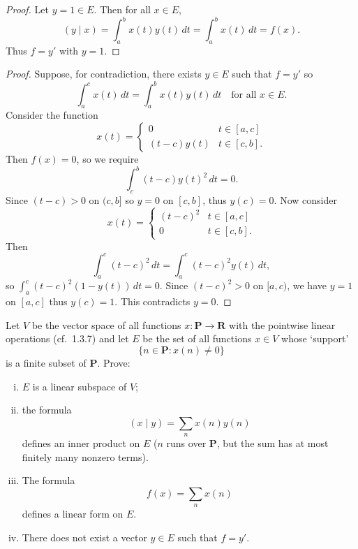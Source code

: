 \begin{proof}
Let $y = 1 \in E$. Then for all $x \in E$,
\[
    (y \mid x) = \int_a^b x(t)y(t)\,dt = \int_a^b x(t)\,dt = f(x).
\]
Thus $f = y'$ with $y = 1$.
\end{proof}


\begin{proof}
Suppose, for contradiction, there exists $y \in E$ such that $f = y'$ so
\[
    \int_a^c x(t)\,dt = \int_a^b x(t)y(t)\,dt \quad \text{for all } x \in E.
\]
Consider the function
\[
    x(t) = \begin{cases} 0 & t \in [a, c] \\ (t-c)y(t) & t \in [c, b]. \end{cases}
\]
Then
$f(x) = 0$, so we require
\[
    \int_c^b (t-c)y(t)^2\,dt = 0.
\]
Since $(t-c) > 0$ on $(c,b]$ so $y = 0$ on $[c,b]$, thus
$y(c) = 0$. Now consider
\[
    x(t) = \begin{cases} (t-c)^2 & t \in [a, c] \\ 0 & t \in [c, b]. \end{cases}
\]
Then
\[
    \int_a^c (t-c)^2\,dt = \int_a^c (t-c)^2 y(t)\,dt,
\]
so $\int_a^c (t-c)^2(1 - y(t))\,dt = 0$. Since $(t-c)^2 > 0$ on $[a,c)$,
we have $y = 1$ on $[a,c]$ thus $y(c) = 1$. This contradicts
$y = 0$.
\end{proof}

\begin{tcolorbox}[title=Problem 2, breakable]
Let $V$ be the vector space of all functions $x : \mathbf{P} \to \mathbf{R}$ 
with the pointwise linear operations (cf.\ 1.3.7) 
and let $E$ be the set of all functions $x \in V$ whose `support'
\[
    \{n \in \mathbf{P} : x(n) \neq 0\}
\]
is a finite subset of $\mathbf{P}$. Prove:
\begin{enumerate}[(i)]
    \item $E$ is a linear subspace of $V$;
    \item the formula
    \[
        (x \mid y) = \sum_n x(n)y(n)
    \]
    defines an inner product on $E$ ($n$ runs over $\mathbf{P}$, but the sum has at most finitely many nonzero terms).
    \item The formula
    \[
        f(x) = \sum_n x(n)
    \]
    defines a linear form on $E$.
    \item There does not exist a vector $y \in E$ such that $f = y'$.
\end{enumerate}
\end{tcolorbox}

